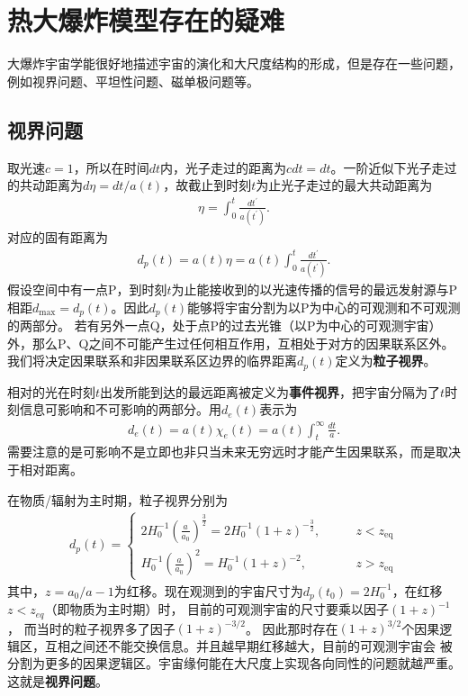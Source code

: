 \section{热大爆炸模型存在的疑难}
大爆炸宇宙学能很好地描述宇宙的演化和大尺度结构的形成，但是存在一些问题，
例如视界问题、平坦性问题、磁单极问题等。

\subsection{视界问题}
取光速$c=1$，所以在时间$dt$内，光子走过的距离为$cdt=dt$。一阶近似下光子走过的共动距离为$d\eta=dt
/a(t)$，故截止到时刻$t$为止光子走过的最大共动距离为
\begin{align}
  \label{eq:conformal_time}
  \eta = \int_0^{t} \frac{dt^{\prime}}{a(t^{\prime})}.
\end{align}
对应的固有距离为
\begin{align}
  \label{eq:particle_horizon}
  d_{p}(t) = a(t)\eta=a(t)\int_0^{t}\frac{dt^{\prime}}{a(t^{\prime})}.
\end{align}
假设空间中有一点P，到时刻$t$为止能接收到的以光速传播的信号的最远发射源与P相距$d_{\text{max}}=d_{p}(t)$。因此$d_{p}(t)$能够将宇宙分割为以P为中心的可观测和不可观测的两部分。
若有另外一点Q，处于点P的过去光锥（以P为中心的可观测宇宙）外，那么P、Q之间不可能产生过任何相互作用，互相处于对方的因果联系区外。我们将决定因果联系和非因果联系区边界的临界距离$d_{p}(t)$定义为\textbf{粒子视界}。

相对的光在时刻$t$出发所能到达的最远距离被定义为\textbf{事件视界}，把宇宙分隔为了$t$时刻信息可影响和不可影响的两部分。用$d_e(t)$表示为
\begin{align}
  d_e(t) = a(t)\chi_e(t) = a(t)\int_t^{\infty}\frac{dt}{a}.
\end{align}
需要注意的是可影响不是立即也非只当未来无穷远时才能产生因果联系，而是取决于相对距离。

在物质/辐射为主时期，粒子视界分别为
\begin{align}
  \label{eq:particle_horizon_matter}
  d_p(t) =
  \begin{cases}
    2H_0^{-1}{\left(\frac{a}{a_0}\right)}^{\frac{3}{2}} =
    2H_0^{-1}{\left(1+z\right)}^{-\frac{3}{2}},\qquad& z<z_{\text{eq}}\\
    H_0^{-1}{\left(\frac{a}{a_0}\right)}^2=H_0^{-1}{\left(1+z\right)}^{-2},\qquad&z>z_{\text{eq}}
  \end{cases}
\end{align}
其中，$z=a_0 /a - 1$为红移。现在观测到的宇宙尺寸为$d_p(t_0)=2H_0^{-1}$，在红移$z < z_{eq}$（即物质为主时期）时，
目前的可观测宇宙的尺寸要乘以因子${\left(1+z\right)}^{-1}$，
而当时的粒子视界多了因子${\left(1+z\right)}^{-3 /2}$。
因此那时存在${\left(1+z\right)}^{3/2}$个因果逻辑区，互相之间还不能交换信息。并且越早期红移越大，目前的可观测宇宙会
被分割为更多的因果逻辑区。宇宙缘何能在大尺度上实现各向同性的问题就越严重。这就是\textbf{视界问题}。

